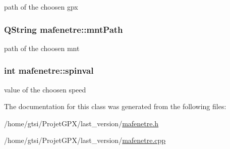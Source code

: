 path of the choosen gpx 

\hypertarget{classmafenetre_af9607457086703b72098cc05d5b9a553}{
\subsubsection[{mnt\+Path}]{\setlength{\rightskip}{0pt plus 5cm}Q\+String mafenetre\+::mnt\+Path}}\label{classmafenetre_af9607457086703b72098cc05d5b9a553}


path of the choosen mnt 

\hypertarget{classmafenetre_a64a51218343d46e32cdf6d8ff41c1919}{
\subsubsection[{spinval}]{\setlength{\rightskip}{0pt plus 5cm}int mafenetre\+::spinval}}\label{classmafenetre_a64a51218343d46e32cdf6d8ff41c1919}


value of the choosen speed 



The documentation for this class was generated from the following files\+:\begin{DoxyCompactItemize}
\item 
/home/gtsi/\+Projet\+G\+P\+X/last\+\_\+version/\hyperlink{mafenetre_8h}{mafenetre.\+h}\item 
/home/gtsi/\+Projet\+G\+P\+X/last\+\_\+version/\hyperlink{mafenetre_8cpp}{mafenetre.\+cpp}\end{DoxyCompactItemize}
